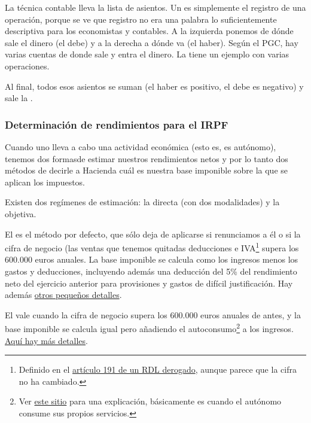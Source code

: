 \documentclass[nochap,palatino,notitlepage]{apuntes}
\begin{document}
La técnica contable lleva la lista de asientos. Un  es simplemente el registro de una operación, porque se ve que registro no era una palabra lo suficientemente descriptiva para los economistas y contables. A la izquierda ponemos de dónde sale el dinero (el debe) y a la derecha a dónde va (el haber). Según el PGC, hay varias cuentas de donde sale y entra el dinero. La  tiene un ejemplo con varias operaciones.

Al final, todos esos asientos se suman (el haber es positivo, el debe es negativo) y sale la .

\subsubsection{Determinación de rendimientos para el IRPF}

Cuando uno lleva a cabo una actividad económica (esto es, es autónomo), tenemos dos formas\footnotemark de estimar nuestros rendimientos netos y por lo tanto dos métodos de decirle a Hacienda cuál es nuestra base imponible sobre la que se aplican los impuestos.


Existen dos regímenes de estimación: la directa (con dos modalidades) y la objetiva.

El  es el método por defecto, que sólo deja de aplicarse si renunciamos a él o si la cifra de negocio (las ventas que tenemos quitadas deducciones e IVA\footnote{Definido en el \href{http://www.boe.es/buscar/doc.php?id=BOE-A-1989-30361}{artículo 191 de un RDL derogado}, aunque parece que la cifra no ha cambiado.} supera los 600.000 euros anuales. La base imponible se calcula como los ingresos menos los gastos y deducciones, incluyendo además una deducción del 5\% del rendimiento neto del ejercicio anterior para provisiones y gastos de difícil justificación. Hay además \href{http://portal.circe.es/es-ES/emprendedor/EmpresarioIndividual/TributacionAutonomos/Paginas/AutonomoEstimacionDirectaSimplificada.aspx}{otros pequeños detalles}.

El  vale cuando la cifra de negocio supera los 600.000 euros anuales de antes, y la base imponible se calcula igual pero añadiendo el autoconsumo\footnote{Ver \href{http://www.pymesyautonomos.com/fiscalidad-y-contabilidad/el-autoconsumo-de-bienes-y-servicios-tratamiento-fiscal-y-contable}{este sitio} para una explicación, básicamente es cuando el autónomo consume sus propios servicios.} a los ingresos. \href{http://portal.circe.es/es-ES/emprendedor/EmpresarioIndividual/TributacionAutonomos/Paginas/autonomoestimacionDirectaNormal.aspx}{Aquí hay más detalles}.
\end{document}
